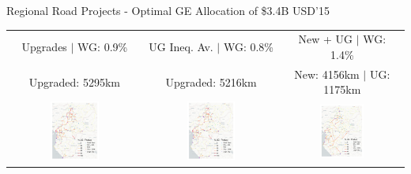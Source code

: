\documentclass[aspectratio=169,xcolor=dvipsnames]{beamer}
\begin{document}
\begin{frame}{Regional Road Projects - Optimal GE Allocation of \$3.4B USD'15}
\vspace{-1mm}
\begin{adjustbox}{center}
\begin{tabular}{@{}c@{}|@{}c@{}|@{}c@{}} 
Upgrades $|$ WG: 0.9\% & UG Ineq. Av. $|$ WG: 0.8\% & New + UG $|$ WG: 1.4\%  \\
Upgraded: 5295km & Upgraded: 5216km & New: 4156km $|$ UG: 1175km \\ 
\includegraphics[width=0.38\textwidth, trim= {0.9cm 0 0.9cm 0}, clip]{"../figures/GE/trans_africa_network_GE_20g_3200m_fixed_cgc_sigma3.8_rho0_julia_MACR_90kmh_google_perc_ug.pdf"} & 
\includegraphics[width=0.38\textwidth, trim= {0.9cm 0 0.9cm 0}, clip]{"../figures/GE/trans_africa_network_GE_20g_3200m_fixed_cgc_sigma3.8_rho2_julia_MACR_90kmh_google_perc_ug.pdf"} &
\includegraphics[width=0.38\textwidth, trim= {0.9cm 0 0.9cm 0}, clip]{"../figures/GE/trans_africa_network_GE_add_20g_3200m_fixed_cgc_sigma3.8_rho0_julia_MACR_90kmh_google_perc_ug.pdf"}  
\end{tabular}
\end{adjustbox}
\end{frame}
\end{document}
